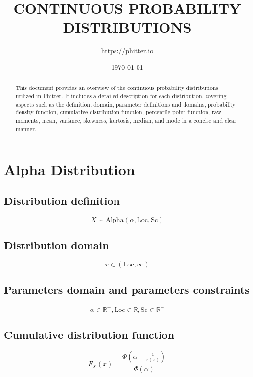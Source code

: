 \documentclass{article}
\begin{document}
\title{\textbf{CONTINUOUS PROBABILITY DISTRIBUTIONS}}
\author{https://phitter.io}
\date{\today}
\maketitle
\begin{abstract}
	This document provides an overview of the continuous probability distributions utilized in Phitter. It includes a detailed description for each distribution, covering aspects such as the definition, domain, parameter definitions and domains, probability density function, cumulative distribution function, percentile point function, raw moments, mean, variance, skewness, kurtosis, median, and mode in a concise and clear manner.
\end{abstract}

\newpage
\tableofcontents










\newpage
\section{Alpha Distribution}
\subsection{Distribution definition}
\begin{equation*} X\sim\mathrm{Alpha}\left(\alpha,\text{Loc},\text{Sc}\right) \end{equation*}
\subsection{Distribution domain}
\begin{equation*} x\in\left(\text{Loc},\infty\right) \end{equation*}
\subsection{Parameters domain and parameters constraints}
\begin{equation*} \alpha\in\mathbb{R}^{+}, \text{Loc}\in\mathbb{R}, \text{Sc}\in\mathbb{R}^{+} \end{equation*}
\subsection{Cumulative distribution function}
\begin{equation*} F_{X}\left(x\right)=\frac{\Phi\left(\alpha-\frac{1}{z(x)}\right)}{\Phi\left(\alpha\right)} \end{equation*}
\end{document}
